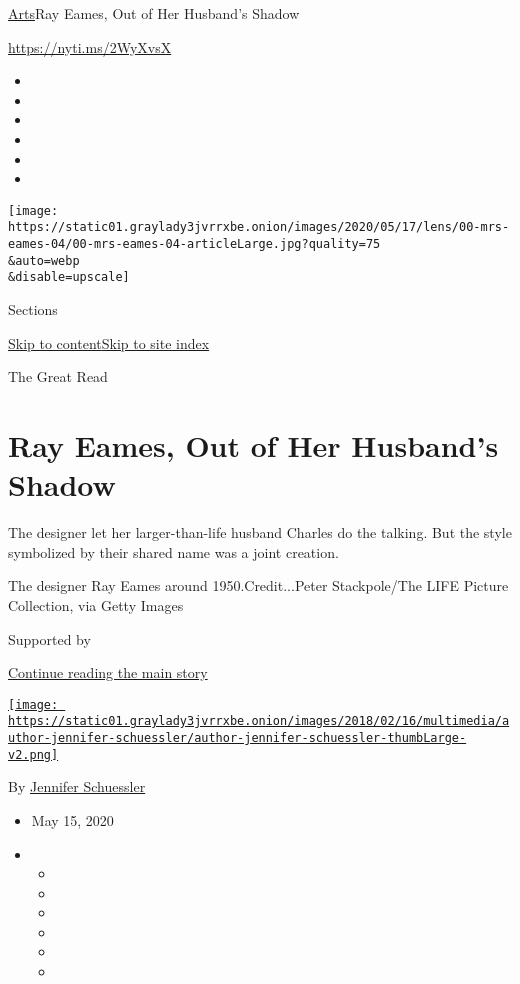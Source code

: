 \href{/section/arts}{Arts}\textbar{}Ray Eames, Out of Her Husband's
Shadow

\url{https://nyti.ms/2WyXvsX}

\begin{itemize}
\item
\item
\item
\item
\item
\item
\end{itemize}

\texttt{[image: https://static01.graylady3jvrrxbe.onion/images/2020/05/17/lens/00-mrs-eames-04/00-mrs-eames-04-articleLarge.jpg?quality=75\\\&auto=webp\\\&disable=upscale]}

Sections

\protect\hyperlink{site-content}{Skip to
content}\protect\hyperlink{site-index}{Skip to site index}

The Great Read

\hypertarget{ray-eames-out-of-her-husbands-shadow}{%
\section{Ray Eames, Out of Her Husband's
Shadow}\label{ray-eames-out-of-her-husbands-shadow}}

The designer let her larger-than-life husband Charles do the talking.
But the style symbolized by their shared name was a joint creation.

The designer Ray Eames around 1950.Credit...Peter Stackpole/The LIFE
Picture Collection, via Getty Images

Supported by

\protect\hyperlink{after-sponsor}{Continue reading the main story}

\href{https://www.nytimes3xbfgragh.onion/by/jennifer-schuessler}{\texttt{[image: https://static01.graylady3jvrrxbe.onion/images/2018/02/16/multimedia/author-jennifer-schuessler/author-jennifer-schuessler-thumbLarge-v2.png]}}

By
\href{https://www.nytimes3xbfgragh.onion/by/jennifer-schuessler}{Jennifer
Schuessler}

\begin{itemize}
\item
  May 15, 2020
\item
  \begin{itemize}
  \item
  \item
  \item
  \item
  \item
  \item
  \end{itemize}
\end{itemize}

